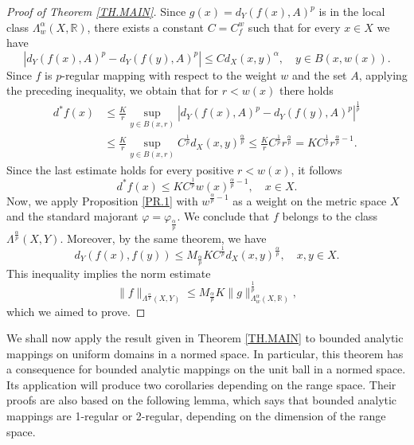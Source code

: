 \documentclass{amsart}
\theoremstyle{definition}
\numberwithin{equation}{section}
\begin{document}
\begin{proof}[Proof of Theorem \ref{TH.MAIN}]
Since $g(x) = d_Y(f(x), A)^p$ is in the local class $\Lambda^\alpha_{w} (X,\mathbb {R})$, there exists a constant
$C = C_{f}^w $ such  that for every $x\in X$ we have
\begin{equation*}
| d_Y  (f(x), A)^p  - d_Y (f(y), A)^p| \le C d_X(x,y)^\alpha,\quad y\in B(x,w(x)).
\end{equation*}
Since $f$ is $p$-regular mapping with respect to the weight $w$ and the set $A$, applying the preceding inequality, we
obtain that for $r<w(x)$ there holds
\begin{equation*}\begin{split}
d^\ast f (x) & \le \frac {K}r \sup_{y\in B(x,r)} | d_Y (f(x), A) ^p  -  d_Y(f(y), A)^p|^{\frac 1p}
\\& \le \frac {K}r \sup_{y\in B(x,r)} C^{\frac 1p} d_X(x,y)^{\frac \alpha p}
 \le \frac {K}r  C^{\frac 1p} r^{\frac \alpha p}
 =   K  C^{\frac 1p} r^{\frac \alpha p-1}.
\end{split}\end{equation*}
Since the last  estimate holds for every positive  $r<w(x)$, it follows
\begin{equation*}
d^\ast f (x) \le   K  C^{\frac 1p} w(x)^{\frac \alpha p-1}, \quad  x\in X.
\end{equation*}
Now, we apply Proposition \ref{PR.1} with $w^{\frac \alpha p -1}$ as a weight on the metric space $X$ and the standard
majorant $\varphi = \varphi_{\frac \alpha p }$. We conclude that $f$ belongs to the class
$\Lambda^{\frac \alpha p} (X,Y)$. Moreover, by the same theorem, we have
\begin{equation*}
d _ Y( f(x), f(y))\le M_{\frac \alpha p}  K C^{\frac 1p} d_X(x,y)^{\frac \alpha p}, \quad x,y\in X.
\end{equation*}
This inequality implies the norm estimate
\begin{equation*}
\|f\|_{ \Lambda^{\frac \alpha p}  (X,Y)}\le M_{\frac \alpha p} K  \|g\|_{\Lambda_{w}^\alpha (X,\mathbb{R})}^{\frac 1p},
\end{equation*}
which we aimed to prove.
\end{proof}


We shall now apply the result given in Theorem \ref{TH.MAIN} to bounded analytic mappings on uniform domains in a normed
space. In particular, this theorem has a consequence for bounded analytic mappings on the unit ball in a normed space.
Its application will produce two corollaries depending on the range space. Their proofs are also based on the following
lemma, which says that bounded analytic mappings are 1-regular or 2-regular, depending on the dimension of the range
space.
\end{document}
